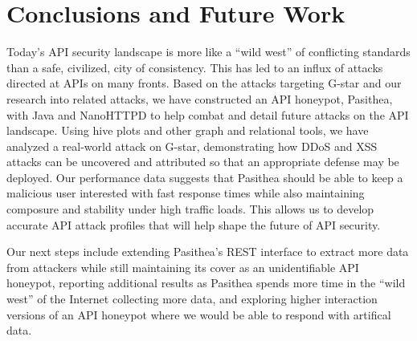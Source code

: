 
\section{Conclusions and Future Work} \label{conclusions}

Today's API security landscape is more like a ``wild west'' of conflicting standards than a safe, civilized, city of consistency.
This has led to an influx of attacks directed at APIs on many  fronts. 
Based on the attacks targeting G-star and our research into related attacks, we have constructed an API honeypot, Pasithea, with Java and NanoHTTPD to help combat and detail future attacks on the API landscape. 
Using hive plots and other graph and relational tools, we have analyzed a real-world attack on G-star, demonstrating how DDoS and XSS attacks can be uncovered and attributed so that an appropriate defense may be deployed.  
Our performance data suggests that Pasithea should be able to keep a malicious user interested with fast response times while also maintaining composure and stability under high traffic loads. 
This allows us to develop accurate API attack profiles that will help shape the future of API security.

Our next steps include extending Pasithea's REST interface to extract more data from attackers while still maintaining its cover as an unidentifiable API honeypot, reporting additional results as Pasithea spends more time in the ``wild west'' of the Internet collecting more data, and exploring higher interaction versions of an API honeypot where we would be able to respond with artifical data.
